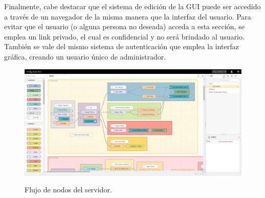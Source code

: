 Finalmente, cabe destacar que el sistema de edición de la GUI puede ser accedido a través de un navegador de la misma manera que la interfaz del usuario. Para evitar que el usuario (o alguna persona no deseada) acceda a esta sección, se emplea un link privado, el cual es confidencial y no será brindado al usuario. También se vale del mismo sistema de autenticación que emplea la interfaz gráfica, creando un usuario único de administrador.

\begin{figure}[H]
	\centering
	\includegraphics[width=0.9\linewidth]{ImagenesIngenieria de Detalle/Node-Red-Flow}
	\label{fig:node_red_flow}
	\caption{Flujo de nodos del servidor.}
\end{figure}